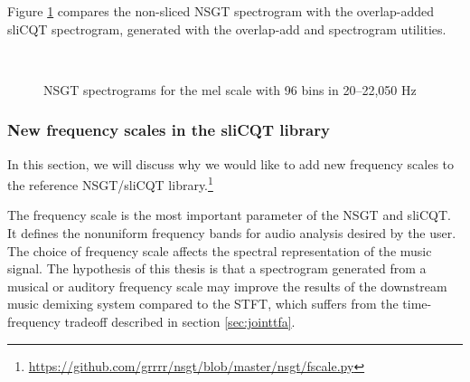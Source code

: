 \documentclass[report.tex]{subfiles}
\begin{document}
Figure \ref{fig:overlappedspectrograms} compares the non-sliced NSGT spectrogram with the overlap-added sliCQT spectrogram, generated with the overlap-add and spectrogram utilities.

\begin{figure}[ht]
	\centering
	\\
	\caption{NSGT spectrograms for the mel scale with 96 bins in 20--22,050 Hz}
	\label{fig:overlappedspectrograms}
\end{figure}

\subsubsection{New frequency scales in the sliCQT library}
\label{sec:improvelib}

In this section, we will discuss why we would like to add new frequency scales to the reference NSGT/sliCQT library.\footnote{\url{https://github.com/grrrr/nsgt/blob/master/nsgt/fscale.py}}

The frequency scale is the most important parameter of the NSGT and sliCQT. It defines the nonuniform frequency bands for audio analysis desired by the user. The choice of frequency scale affects the spectral representation of the music signal. The hypothesis of this thesis is that a spectrogram generated from a musical or auditory frequency scale may improve the results of the downstream music demixing system compared to the STFT, which suffers from the time-frequency tradeoff described in section \ref{sec:jointtfa}.
\end{document}

